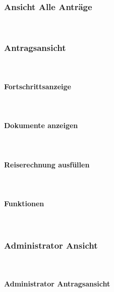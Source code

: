 ~\\

\newpage
\subsubsection{Ansicht Alle Anträge}

~\\

\newpage
\subsubsection{Antragsansicht}
~\\
\paragraph{Fortschrittsanzeige}
~\\
\paragraph{Dokumente anzeigen}
~\\
\paragraph{Reiserechnung ausfüllen}
~\\
\paragraph{Funktionen}
~\\

\newpage
\subsubsection{Administrator Ansicht}
~\\

\newpage
\paragraph{Administrator Antragsansicht}
~\\

\newpage
